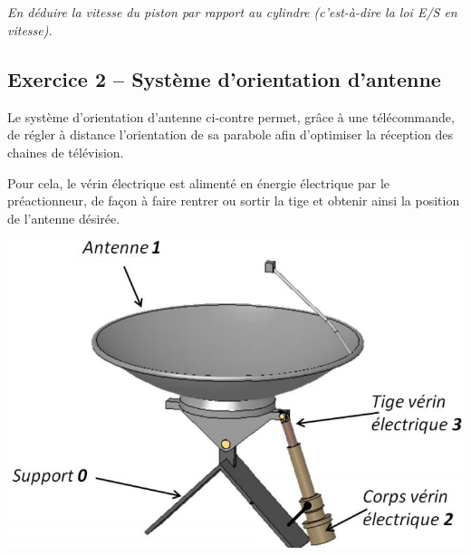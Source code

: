 \documentclass[11pt,oneside]{article}
\begin{document}


\subparagraph{}
\textit{En déduire la vitesse du piston par rapport au cylindre (c'est-à-dire la loi E/S en vitesse). }


\newpage

\subsection*{Exercice 2 -- Système d'orientation d'antenne}
\setcounter{subparagraph}{0}

\begin{minipage}[c]{.65\linewidth}
Le système d’orientation d’antenne ci-contre permet, grâce à une télécommande, de régler à distance l’orientation de sa parabole afin d’optimiser la réception des chaines de télévision. 
 
Pour cela, le vérin électrique est alimenté en énergie électrique par le préactionneur, de façon à faire rentrer ou sortir la tige et obtenir ainsi la position de l’antenne désirée. 
\end{minipage} \hfill
\begin{minipage}[c]{.3\linewidth}
\begin{center}
\includegraphics[width=.95\textwidth]{png/fig3} 
\end{center}
\end{minipage} 
\end{document}
